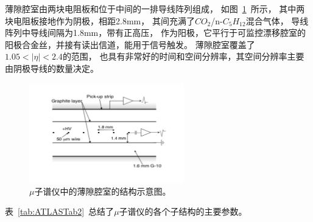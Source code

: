 薄隙腔室由两块电阻板和位于中间的一排导线阵列组成，
如图~\ref{fig:ATLASMS4}~所示，
其中两块电阻板接地作为阴极，相距2.8mm，
其间充满了$CO_2$/n-$C_5H_{12}$混合气体，
导线阵列中导线间隔为1.8mm，带有正高压，
作为阳极，它平行于可监控漂移腔室的阳极合金丝，并接有读出信道，能用于信号触发。
薄隙腔室覆盖了$1.05<|\eta|<2.4$的范围，
也具有非常好的时间和空间分辨率，其空间分辨率主要由阴极导线的数量决定。


\begin{figure}
  \begin{center}
    \includegraphics[width=0.6\textwidth]{figuresEXP/ATLASMS4.jpg}
  \end{center}
  \caption{
  $\mu$子谱仪中的薄隙腔室的结构示意图。
  }
    \label{fig:ATLASMS4}
\end{figure}

表~\ref{tab:ATLASTab2}~总结了$\mu$子谱仪的各个子结构的主要参数。


